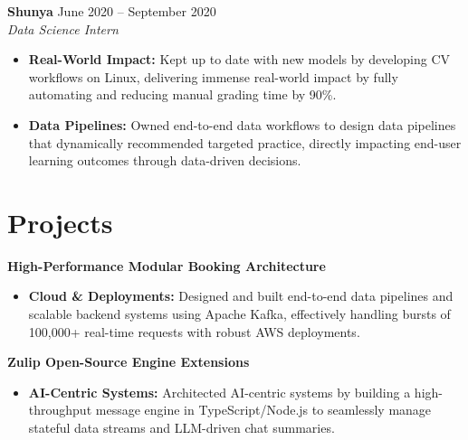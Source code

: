 \documentclass[11pt,a4paper]{article}
\begin{document}
\vspace{3pt}
\noindent
\textbf{Shunya} \hfill June 2020 -- September 2020 \\
\textit{Data Science Intern}
\begin{itemize}[leftmargin=*,noitemsep,topsep=0pt]
    \item \textbf{Real-World Impact:} Kept up to date with new models by developing CV workflows on Linux, delivering immense real-world impact by fully automating and reducing manual grading time by 90\%.
    \item \textbf{Data Pipelines:} Owned end-to-end data workflows to design data pipelines that dynamically recommended targeted practice, directly impacting end-user learning outcomes through data-driven decisions.
\end{itemize}

\vspace{-5pt}
\section{Projects}
\noindent
\textbf{High-Performance Modular Booking Architecture}
\begin{itemize}[leftmargin=*,noitemsep,topsep=0pt]
    \item \textbf{Cloud \& Deployments:} Designed and built end-to-end data pipelines and scalable backend systems using Apache Kafka, effectively handling bursts of 100,000+ real-time requests with robust AWS deployments.
\end{itemize}

\vspace{3pt}
\noindent
\textbf{Zulip Open-Source Engine Extensions}
\begin{itemize}[leftmargin=*,noitemsep,topsep=0pt]
    \item \textbf{AI-Centric Systems:} Architected AI-centric systems by building a high-throughput message engine in TypeScript/Node.js to seamlessly manage stateful data streams and LLM-driven chat summaries.
\end{itemize}
\end{document}
